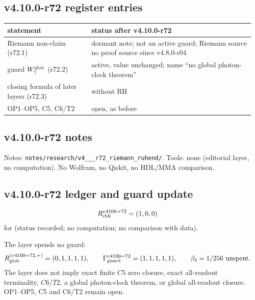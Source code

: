 \subsection*{v4.10.0-r72 register entries}
\label{subsec:v4100-r72-register}

\begin{center}
\small
\begin{tabular}{@{}>{\raggedright\arraybackslash}p{}>{\raggedright\arraybackslash}p{}@{}}
\toprule
statement & status after v4.10.0-r72\\
\midrule
Riemann non-claim (r72.1) & dormant note; not an active guard; Riemann source no proof source since v4.8.0-r04\\
guard \(W_\gamma^{\rm glob}\) (r72.2) & active, value unchanged; name ``no global photon-clock theorem''\\
closing formula of later layers (r72.3) & without RH\\
OP1--OP5, C5, C6/T2 & open, as before\\
\bottomrule
\end{tabular}
\end{center}

\subsection*{v4.10.0-r72 notes}
\label{subsec:v4100-r72-notes}

{\raggedright
Notes: \texttt{notes/\allowbreak research/\allowbreak v4\_\_\_\allowbreak r72\_\allowbreak riemann\_\allowbreak ruhend/}.
Tools: none (editorial layer, no computation).  No Wolfram, no Qiskit, no HDL/MMA comparison.
\par}

\subsection*{v4.10.0-r72 ledger and guard update}
\label{subsec:v4100-r72-ledger-guard}

\[
R_{\rm chk}^{v4100\text{-}r72}=(1,0,0)
\]
for (status recorded; no computation; no comparison with data).

The layer spends no guard:
\[
R_{\rm glob}^{(v4100\text{-}r72,+)}=(0,1,1,1,1),
\qquad
\Gamma_{\rm guard}^{v4100\text{-}r72}=(1,1,1,1,1),
\qquad
\beta_4=1/256\ \text{unspent}.
\]
The layer does not imply exact finite \(C5\) zero closure, exact all-readout terminality, \(C6/T2\), a global photon-clock theorem,
or global all-readout closure.  OP1--OP5, C5 and C6/T2 remain open.
